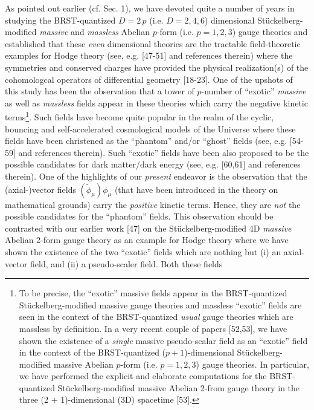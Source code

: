 \documentclass[12pt]{article}
\begin{document}
As pointed out earlier (cf. Sec. 1), we have devoted quite a number of years in studying the BRST-quantized $D = 2\, p$ 
(i.e. $ D = 2, 4, 6 $) dimensional St{\" u}ckelberg-modified {\it massive} and {\it massless}
 Abelian $p$-form (i.e. $ p = 1, 2, 3$) gauge theories
and established that these {\it even} dimensional theories are 
the tractable field-theoretic examples for Hodge theory (see, e.g. [47-51] and references therein) 
where the symmetries and conserved charges 
have provided the physical realization(s) of the cohomologcal operators of differential geometry [18-23]. One of the upshots of this study
has been the observation that a tower of $p$-number of ``exotic'' {\it massive} as well as {\it massless} fields appear in these theories which carry
the negative kinetic terms\footnote{To be precise, the ``exotic'' massive fields appear in the BRST-quantized St{\" u}ckelberg-modified massive
gauge theories and massless ``exotic'' fields are seen in the context of the BRST-quantized {\it usual}  gauge theories which are massless by definition. In 
a very recent couple of papers [52,53], we have shown the existence of a {\it single} massive pseudo-scalar field as an ``exotic'' field
in the context of the BRST-quantized ($p + 1$)-dimensional  St{\" u}ckelberg-modified massive Abelian $p$-form (i.e. $p = 1, 2, 3$) gauge
theories. In particular, we have performed the explicit and elaborate computations for the BRST-quantized  St{\" u}ckelberg-modified massive Abelian 2-from 
gauge theory in the three (2 + 1)-dimensional (3D) spacetime [53].}. 
Such fields have become quite popular in the realm of the cyclic, bouncing and self-accelerated cosmological models of the Universe 
where these fields have been christened as the ``phantom'' and/or ``ghost'' fields (see, e.g. [54-59] and references therein). Such ``exotic'' fields
have been also proposed to be the possible candidates for dark matter/dark energy (see, e.g. [60,61] and references therein). One of the highlights of 
our {\it present} endeavor is the observation that the (axial-)vector fields $(\widetilde \phi_\mu)\phi_\mu$ (that have been introduced in the theory on mathematical
grounds) carry the {\it positive} kinetic terms. Hence, they are {\it not} the possible candidates for the ``phantom'' fields. This observation should
be contrasted with our earlier work [47] on the St{\" u}ckelberg-modified 4D {\it massive} Abelian 2-form gauge theory 
as an example for Hodge theory where we have shown the
existence of the two ``exotic'' fields which are nothing but (i) an axial-vector field, and (ii) a pseudo-scaler field. Both these fields 
\end{document}
